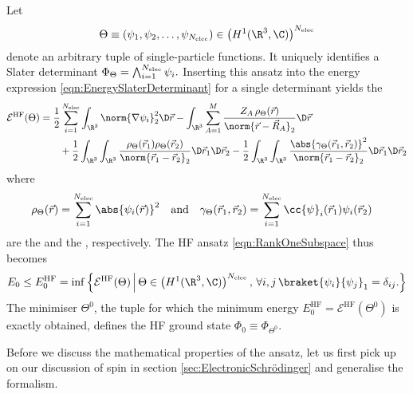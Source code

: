 \begin{rem}
	Let
	\[  \Theta \equiv \left(\psi_1, \psi_2, \ldots, \psi_{\Nelec}\right)
		\in \left(H^1(\R^3, \C)\right)^{\Nelec} \]
	denote an arbitrary tuple of single-particle functions.
	It uniquely identifies a Slater determinant
	$\Phi_\Theta = \bigwedge_{i=1}^{N_\text{elec}} \psi_i.$
	Inserting this ansatz into the energy expression
	\eqref{eqn:EnergySlaterDeterminant} for a single determinant
	yields the 
	\begin{equation}
		\begin{aligned}
		\mathcal{E}^\text{HF}(\Theta)
		&= \frac12 \sum_{i=1}^{\Nelec} \int_{\R^3} \norm{\nabla \psi_i}_2^2 \D\vec{r}
		- \int_{\R^3} \sum_{A=1}^M
			\frac{Z_A \, \rho_\Theta(\vec{r})}{\norm{\vec{r} - \vec{R}_A}_2} \D\vec{r} \\
		&\hspace{20pt}
		+ \frac12 \int_{\R^3}\int_{\R^3}
			\frac{\rho_\Theta(\vec{r}_1) \rho_\Theta(\vec{r}_2)}
				{\norm{\vec{r}_1 - \vec{r}_2}_2} \D\vec{r}_1 \D\vec{r}_2
		- \frac12 \int_{\R^3}\int_{\R^3}
			\frac{\abs{\gamma_\Theta(\vec{r}_1, \vec{r}_2)}^2}
				{\norm{\vec{r}_1 - \vec{r}_2}_2} \D\vec{r}_1 \D\vec{r}_2
		\end{aligned}
		\label{eqn:HFEnergyFunctional}
	\end{equation}
	where
	\begin{align}
		\label{eqn:HFDensityNoSpin}
		\rho_\Theta(\vec{r}) &= \sum_{i=1}^{\Nelec} \abs{\psi_i(\vec{r})}^2
		&\text{and} &&
		\gamma_\Theta(\vec{r}_1,\vec{r}_2)
			&= \sum_{i=1}^{\Nelec} \cc{\psi}_i(\vec{r}_1) \psi_i(\vec{r}_2)
	\end{align}
	are the 
	and the , respectively.
	The HF ansatz \eqref{eqn:RankOneSubspace}
	thus becomes
	\begin{equation}
		E_0 \leq E_0^\text{HF}
		= \inf \left\{
			\mathcal{E}^\text{HF}(\Theta)
			\, \middle| \,
			\Theta \in \left(H^1(\R^3, \C)\right)^{\Nelec}, \,
			\forall i,j \,
			\braket{\psi_i}{\psi_j}_1 = \delta_{ij}.
		\right\}
		\label{eqn:HFMO}
	\end{equation}
	The minimiser $\Theta^0$, \ie the tuple for which the minimum
	energy $E_0^\text{HF} = \mathcal{E}^\text{HF}(\Theta^0)$
	is exactly obtained,
	defines the HF ground state
	$\Phi_0 \equiv \Phi_{\Theta^0}$.
\end{rem}

Before we discuss the mathematical properties of the \HF ansatz,
let us first pick up on our discussion
of spin in section \vref{sec:ElectronicSchrödinger}
and generalise the formalism.

